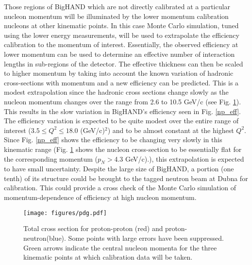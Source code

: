 \documentclass[12pt,letterpaper,oneside]{article}
\begin{document}
Those 
regions of BigHAND which are not directly calibrated at a particular nucleon
momentum will be illuminated by the lower momentum
calibration nucleons at other kinematic points.  In this case
Monte Carlo simulation, tuned using the lower energy measurements, will
be used to extrapolate the efficiency calibration to the momentum of
interest.  Essentially, the observed efficiency at lower momentum can
be used to determine an effective number of interaction lengths in
sub-regions of the detector.  The effective thickness can then be
scaled to higher momentum by taking into account the known variation
of hadronic cross-sections with momentum and a new efficiency can be 
predicted.  This is a modest extrapolation
since the hadronic cross sections change slowly as the nucleon
momentum changes over the range from 2.6 to 10.5 GeV/c (see Fig.
\ref{pdg-sigmann}).
This results in the slow variation in BigHAND's efficiency seen in
Fig. \ref{np_eff}.  The efficiency variation is expected to be quite modest
over the entire range of interest ($3.5\le Q^2\le 18.0$ (GeV/c)$^2$)
and to be almost constant at the highest $Q^2$.
Since Fig. \ref{np_eff} shows the
efficiency to be changing very slowly in this kinematic range
(Fig.  \ref{pdg-sigmann} shows the nucleon cross-section 
to be essentially flat for the corresponding
momentum ($p_N>$4.3 GeV/c).), this extrapolation is expected to have
small uncertainty. 
Despite the large size of BigHAND, a portion (one tenth)
of its structure could be brought to the tagged neutron
beam at Dubna for calibration.  This could  provide a cross check of the 
Monte Carlo simulation of momentum-dependence of efficiency at high
nucleon momentum.


\begin{figure}
\begin{center}
\texttt{[image: figures/pdg.pdf]}
\end{center}
\caption{\label{pdg-sigmann}
Total cross section \cite{PDG} for proton-proton (red) 
and proton-neutron(blue).  Some
points with large errors have been suppressed.  Green arrows indicate
the central nucleon momenta for the three kinematic points at which
calibration data will be taken.  }
\end{figure}
\end{document}
